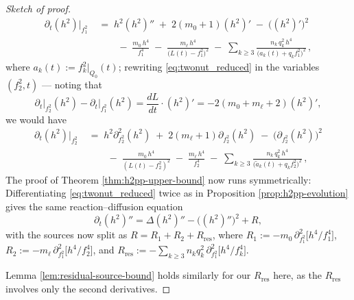 \documentclass[11pt]{amsart}
\theoremstyle{plain}
\numberwithin{equation}{section}
\theoremstyle{definition}
\theoremstyle{remark}
\begin{document}
\begin{proof}[Sketch of proof]
\begin{align}\label{eq:twonut_reduced}
\partial_t ( h^2 ) \big|_{f_1^2} & \;=\; h^2 ( h^2 )'' \;+\; 2 ( m_0 + 1 ) ( h^2 )' \;-\; \big( ( h^2 )' \big)^2 \\
& \qquad \;-\; \frac{m_0\, h^4}{f_1^4} \;-\; \frac{m_\ell\, h^4}{\big( L (t) - f_1^2 \big)^2} \;-\; \sum_{k \geq 3} \frac{n_k\, q_k^2\, h^4}{\big( a_k (t) + q_k f_1^2 \big)^2} \,, \nonumber
\end{align}
where $a_k (t) := f_k^2 \big|_{Q_0} (t)$; rewriting \eqref{eq:twonut_reduced} in the variables $( f_2^2, t )$ --- noting that
\[\partial_t\big|_{f_2^2}(h^2) - \partial_t\big|_{f_1^2}(h^2) = \frac{dL}{dt}\cdot(h^2)' = -2(m_0+m_\ell+2)(h^2)',\]
we would have
\begin{align}\label{eq:twonut_reduced_f_2}
\partial_t ( h^2 ) \big|_{f_2^2} & \;=\; h^2\partial_{f_2^2}^2  ( h^2 ) \;+\; 2 ( m_\ell + 1 ) \partial_{f_2^2}( h^2 ) \;-\; \big( \partial_{f_2^2}( h^2 ) \big)^2 \\
& \qquad \;-\; \frac{m_0\, h^4}{(L(t) - f_2^2)^2} \;-\; \frac{m_\ell\, h^4}{f_2^4} \;-\; \sum_{k \geq 3} \frac{n_k\, q_k^2\, h^4}{\big( \tilde{a}_k (t) + q_k f_2^2 \big)^2} \,, \nonumber
\end{align}
The proof of Theorem \ref{thm:h2pp-upper-bound} now runs symmetrically: Differentiating \eqref{eq:twonut_reduced} twice as in Proposition \ref{prop:h2pp-evolution} gives the same reaction--diffusion equation $$\partial_t ( h^2 )'' = \Delta ( h^2 )'' - \big( ( h^2 )'' \big)^2 + R,$$ with the sources now split as $R = R_1 + R_2 + R_{\mathrm{res}}$, where $R_1 := - m_0\, \partial_{f_1^2}^2 \big[ h^4 / f_1^4 \big]$, $R_2 := - m_\ell\, \partial_{f_1^2}^2 \big[ h^4 / f_2^4 \big]$, and $R_{\mathrm{res}} := - \sum_{k \geq 3} n_k q_k^2\, \partial_{f_1^2}^2 \big[ h^4 / f_k^4 \big]$.

Lemma \ref{lem:residual-source-bound} holds similarly for our $R_{\textrm{res}}$ here, as the $R_{\textrm{res}}$ involves only the second derivatives.


\end{proof}
\end{document}
